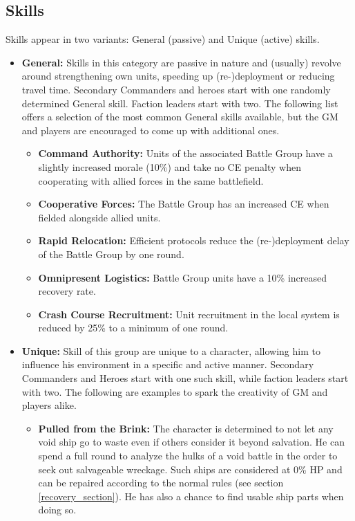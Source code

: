 \subsection{Skills}
Skills appear in two variants: General (passive) and Unique (active) skills.
\begin{itemize}
	\item \textbf{General:} Skills in this category are passive in nature and (usually) revolve around strengthening own units, speeding up (re-)deployment or reducing travel time. Secondary Commanders and heroes start with one randomly determined General skill. Faction leaders start with two. The following list offers a selection of the most common General skills available, but the GM and players are encouraged to come up with additional ones.
	\begin{itemize}
		\item \textbf{Command Authority:} Units of the associated Battle Group have a slightly increased morale (10\%) and take no CE penalty when cooperating with allied forces in the same battlefield.
		\item \textbf{Cooperative Forces:} The Battle Group has an increased CE when fielded alongside allied units.
		\item \textbf{Rapid Relocation:} Efficient protocols reduce the (re-)deployment delay of the Battle Group by one round.
		\item \textbf{Omnipresent Logistics:} Battle Group units have a 10\% increased recovery rate.
		\item \textbf{Crash Course Recruitment:} Unit recruitment in the local system is reduced by 25\% to a minimum of one round.
	\end{itemize}
	\item \textbf{Unique:} Skill of this group are unique to a character, allowing him to influence his environment in a specific and active manner. Secondary Commanders and Heroes start with one such skill, while faction leaders start with two. The following are examples to spark the creativity of GM and players alike.
	\begin{itemize}
		\item \textbf{Pulled from the Brink:} The character is determined to not let any void ship go to waste even if others consider it beyond salvation. He can spend a full round to analyze the hulks of a void battle in the order to seek out salvageable wreckage. Such ships are considered at 0\% HP and can be repaired according to the normal rules (see section \ref{recovery_section}). He has also a chance to find usable ship parts when doing so.

\end{itemize}
\end{itemize}
